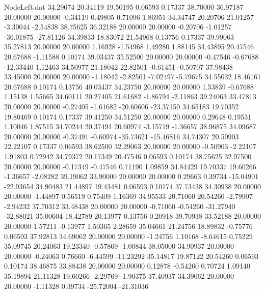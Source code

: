 \begin{filecontents}{NodeLeft.dat}
  34.29674   20.34119   19.50195     0.06593    0.17337   38.70000   36.97187   20.00000   20.00000   -0.34119    0.49805    0.71096    1.86951
  34.34747   20.20706   21.01257    -3.30044   -2.54838   38.75625   36.32188   20.00000   20.00000   -0.20706   -1.01257  -36.01875  -27.81126
  34.39833   18.83072   21.54968     0.13756    0.17337   39.99063   35.27813   20.00000   20.00000    1.16928   -1.54968    1.49280    1.88145
  34.43895   20.47546   20.67688    -1.11588    0.10174   39.03437   35.52500   20.00000   20.00000   -0.47546   -0.67688  -12.33440    1.12463
  34.50977   21.18042   22.82501    -0.61451   -0.50707   37.98438   33.45000   20.00000   20.00000   -1.18042   -2.82501   -7.02497   -5.79675
  34.55032   18.46161   20.67688     0.10174    0.13756   40.03437   34.23750   20.00000   20.00000    1.53839   -0.67688    1.15138    1.55665
  34.60111   20.27405   21.61682    -1.86794   -2.11863   39.24063   33.47813   20.00000   20.00000   -0.27405   -1.61682  -20.60606  -23.37150
  34.65183   19.70352   19.80469     0.10174    0.17337   39.41250   34.51250   20.00000   20.00000    0.29648    0.19531    1.10046    1.87515
  34.70244   20.37491   20.60974    -3.15719   -1.36657   38.96875   34.09687   20.00000   20.00000   -0.37491   -0.60974  -35.73621  -15.46816
  34.74307   20.50903   22.22107     0.17337    0.06593   38.62500   32.29063   20.00000   20.00000   -0.50903   -2.22107    1.91803    0.72942
  34.79372   20.17349   20.47546     0.06593    0.10174   38.75625   32.97500   20.00000   20.00000   -0.17349   -0.47546    0.71190    1.09859
  34.84429   19.70337   19.60266    -1.36657   -2.08282   39.19062   33.90000   20.00000   20.00000    0.29663    0.39734  -15.04901  -22.93654
  34.90483   21.44897   19.43481     0.06593    0.10174   37.73438   34.30938   20.00000   20.00000   -1.44897    0.56519    0.75409    1.16369
  34.95533   20.71060   20.54260    -2.79907   -2.94232   37.70312   33.48438   20.00000   20.00000   -0.71060   -0.54260  -31.27940  -32.88021
  35.00604   18.42789   20.13977     0.13756    0.20918   39.70938   33.52188   20.00000   20.00000    1.57211   -0.13977    1.50365    2.28659
  35.04661   21.24756   18.89832    -0.75776    0.06593   37.92813   34.69062   20.00000   20.00000   -1.24756    1.10168   -8.64615    0.75229
  35.09745   20.24063   19.23340    -0.57869   -1.00844   38.05000   34.90937   20.00000   20.00000   -0.24063    0.76660   -6.44599  -11.23292
  35.14817   19.87122   20.54260     0.06593    0.10174   38.46875   33.88438   20.00000   20.00000    0.12878   -0.54260    0.70724    1.09140
  35.19894   21.11328   19.60266    -2.29769   -1.90375   37.40937   34.39062   20.00000   20.00000   -1.11328    0.39734  -25.72004  -21.31036

\end{filecontents}
